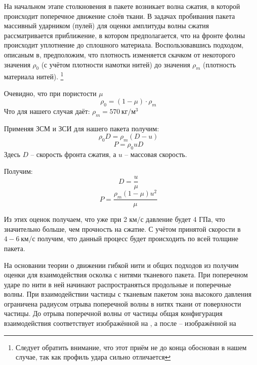 На начальном этапе столкновения в пакете возникает волна сжатия, в которой происходит поперечное движение слоёв ткани.
В задачах пробивания пакета массивный ударником (пулей) для оценки амплитуды волны сжатия рассматривается приближение,
в котором предполагается, что на фронте фолны происходит уплотнение до сплошного материала.
Воспользовавшись подходом, описаным в\cite{kobylkin2014}, предположим, что плотность изменяется скачком от некоторого
значения $\rho_0$ (с учётом плотности намотки нитей) до значения $\rho_m$ (плотность материала нитей).
\footnote{Следует обратить внимание, что этот приём не до конца обоснован в нашем случае, так как профиль удара сильно
отличается}

Очевидно, что при пористости $\mu$
\begin{equation}
    \rho_0 = (1 - \mu) \cdot \rho_m
\end{equation}
Что для нашего случая даёт: $\rho_m = 570~кг / м^3$

Применяя ЗСМ и ЗСИ для нашего пакета получим:
\begin{equation}
    \rho_0 D = \rho_m (D - u)
\end{equation}
\begin{equation}
    P = \rho_0 u D
\end{equation}
Здесь $D$ -- скорость фронта сжатия, а $u$ -- массовая скорость.

Получим:
\begin{equation}
    D = \frac{u}{\mu}
\end{equation}
\begin{equation}
    P = \frac{\rho_m (1 - \mu) u ^2}{\mu}
\end{equation}

Из этих оценок получаем, что уже при 2 $км/с$ давление будет 4 ГПа, что значительно больше, чем прочность на сжатие.
С учётом принятой скорости в $4-6~км/с$ получим, что данный процесс будет происходить по всей толщине пакета.

На основании теории о движении гибкой нити \cite{rakhmatulin} и общих подходов из \cite{kobylkin2014} получим оценки для взаимодействия
осколка с нитями тканевого пакета.
При поперечном ударе по нити в ней начинают распространяться продольные и поперечные волны.
При взаимодействии частицы с тканевым пакетом зона высокого давления ограничена радиусом отрыва поперечной волны
в нитях ткани от поверхности частицы.
До отрыва поперечной волны от частицы общая конфигурация взаимодействия соответствует изображённой на
, а после -- изображённой на 

